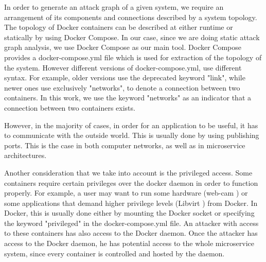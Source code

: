 In order to generate an attack graph of a given system, we require an arrangement of its components and connections described by a system topology. The topology of Docker containers can be described at either runtime or statically by using Docker Compose. In our case, since we are doing static attack graph analysis, we use Docker Compose as our main tool. Docker Compose provides a docker-compose.yml file which is used for extraction of the topology of the system. However different versions of docker-compose.yml, use different syntax. For example, older versions use the deprecated keyword "link", while newer ones use exclusively "networks", to denote a connection between two containers. In this work, we use the keyword "networks" as an indicator that a connection between two containers exists.

However, in the majority of cases, in order for an application to be useful, it has to communicate with the outside world. This is usually done by using publishing ports. This is the case in both computer networks, as well as in microservice architectures.

Another consideration that we take into account is the privileged access. Some containers require certain privileges over the docker daemon in order to function properly. For example, a user may want to run some hardware (web-cam \cite{webcam}) or some applications that demand higher privilege levels (Libvirt \cite{libvirt}) from Docker. In Docker, this is usually done either by mounting the Docker socket or specifying the keyword "privileged" in the docker-compose.yml file. An attacker with access to these containers has also access to the Docker daemon. Once the attacker has access to the Docker daemon, he has potential access to the whole microservice system, since every container is controlled and hosted by the daemon.

